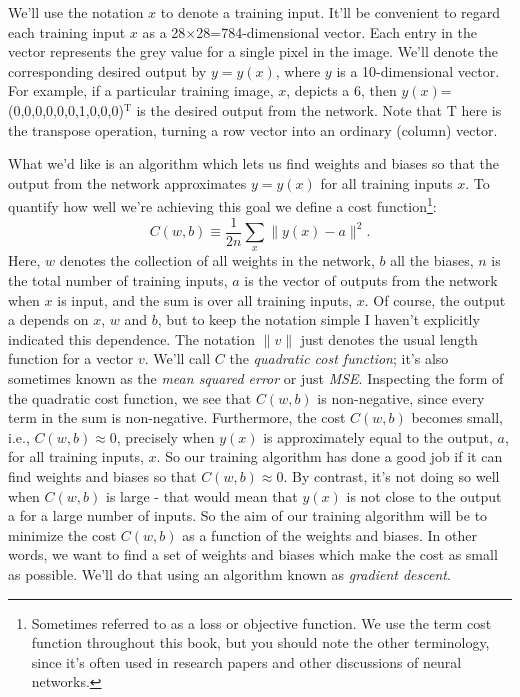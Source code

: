 We'll use the notation $x$ to denote a training input. It'll be convenient to regard each training input $x$ as a 28$\times$28=784-dimensional vector. Each entry in the vector represents the grey value for a single pixel in the image. We'll denote the corresponding desired output by $y=y(x)$, where $y$ is a 10-dimensional vector. For example, if a particular training image, $x$, depicts a 6, then $y(x)$=(0,0,0,0,0,0,1,0,0,0)$^\textrm{T}$ is the desired output from the network. Note that T here is the transpose operation, turning a row vector into an ordinary (column) vector.

What we'd like is an algorithm which lets us find weights and biases so that the output from the network approximates $y=y(x)$ for all training inputs $x$. To quantify how well we're achieving this goal we define a cost function\footnote{Sometimes referred to as a loss or objective function. We use the term cost function throughout this book, but you should note the other terminology, since it's often used in research papers and other discussions of neural networks.}:
\begin{equation}
C(w, b) \equiv \frac{1}{2 n} \sum_{x}\parallel y(x)-a\parallel ^{2}.
\label{eq:c01-06-MSEcostfunction}
\end{equation}
Here, $w$ denotes the collection of all weights in the network, $b$ all the biases, $n$ is the total number of training inputs, $a$ is the vector of outputs from the network when $x$ is input, and the sum is over all training inputs, $x$. Of course, the output a depends on $x$, $w$ and $b$, but to keep the notation simple I haven't explicitly indicated this dependence. The notation $\parallel v\parallel$ just denotes the usual length function for a vector $v$. We'll call $C$ the \textit{quadratic cost function}; it's also sometimes known as the \textit{mean squared error} or just \textit{MSE}. Inspecting the form of the quadratic cost function, we see that $C(w,b)$ is non-negative, since every term in the sum is non-negative. Furthermore, the cost $C(w,b)$ becomes small, i.e., $C(w,b)\approx 0$, precisely when $y(x)$ is approximately equal to the output, $a$, for all training inputs, $x$. So our training algorithm has done a good job if it can find weights and biases so that $C(w,b)\approx 0$. By contrast, it's not doing so well when $C(w,b)$ is large - that would mean that $y(x)$ is not close to the output a for a large number of inputs. So the aim of our training algorithm will be to minimize the cost $C(w,b)$ as a function of the weights and biases. In other words, we want to find a set of weights and biases which make the cost as small as possible. We'll do that using an algorithm known as \textit{gradient descent}.

